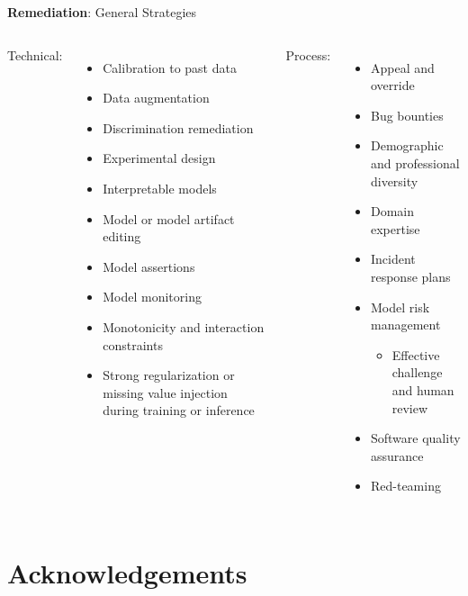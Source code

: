 \documentclass[11pt,
               aspectratio=169,
               hyperref={colorlinks}
               ]{beamer}
\begin{document}
			\begin{frame}[t]{\textbf{Remediation}: General Strategies}

				\begin{columns}[t]
					
					Technical: 
					\begin{itemize}\small
						\item Calibration to past data
						\item Data augmentation
						\item Discrimination remediation
						\item Experimental design
						\item Interpretable models
						\item Model or model artifact editing
						\item Model assertions
						\item Model monitoring
						\item Monotonicity and interaction constraints
						\item Strong regularization or missing value injection during training or inference
					\end{itemize}	
					
					Process:
					\begin{itemize}\small
						\item Appeal and override
						\item Bug bounties
						\item Demographic and professional diversity
						\item Domain expertise
						\item Incident response plans
						\item Model risk management
						\begin{itemize}
							\item Effective challenge and human review
						\end{itemize}
						\item Software quality assurance
						\item Red-teaming
					\end{itemize}
				\end{columns}

			
				
			\end{frame}

\section{Acknowledgements} 
\end{document}
